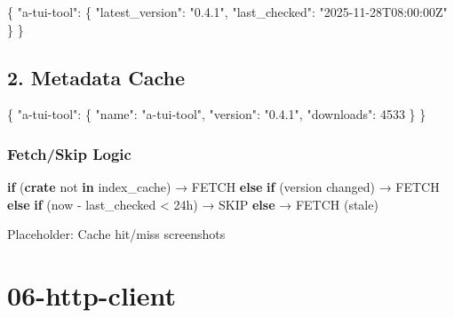 \documentclass[
  letterpaper,
  DIV=11,
  numbers=noendperiod]{scrreprt}
\newenvironment{Shaded}{\begin{snugshade}}{\end{snugshade}}
\newcommand{\ControlFlowTok}[1]{\textcolor[rgb]{0.00,0.23,0.31}{\textbf{#1}}}
\newcommand{\DataTypeTok}[1]{\textcolor[rgb]{0.68,0.00,0.00}{#1}}
\newcommand{\DecValTok}[1]{\textcolor[rgb]{0.68,0.00,0.00}{#1}}
\newcommand{\FunctionTok}[1]{\textcolor[rgb]{0.28,0.35,0.67}{#1}}
\newcommand{\KeywordTok}[1]{\textcolor[rgb]{0.00,0.23,0.31}{\textbf{#1}}}
\newcommand{\NormalTok}[1]{\textcolor[rgb]{0.00,0.23,0.31}{#1}}
\newcommand{\OperatorTok}[1]{\textcolor[rgb]{0.37,0.37,0.37}{#1}}
\newcommand{\StringTok}[1]{\textcolor[rgb]{0.13,0.47,0.30}{#1}}
\begin{document}
\begin{Shaded}
\begin{Highlighting}[]
\FunctionTok{\{}
  \DataTypeTok{"a{-}tui{-}tool"}\FunctionTok{:} \FunctionTok{\{}
    \DataTypeTok{"latest\_version"}\FunctionTok{:} \StringTok{"0.4.1"}\FunctionTok{,}
    \DataTypeTok{"last\_checked"}\FunctionTok{:} \StringTok{"2025{-}11{-}28T08:00:00Z"}
  \FunctionTok{\}}
\FunctionTok{\}}
\end{Highlighting}
\end{Shaded}

\section{2. Metadata Cache}\label{metadata-cache}

\begin{Shaded}
\begin{Highlighting}[]
\FunctionTok{\{}
  \DataTypeTok{"a{-}tui{-}tool"}\FunctionTok{:} \FunctionTok{\{}
    \DataTypeTok{"name"}\FunctionTok{:} \StringTok{"a{-}tui{-}tool"}\FunctionTok{,}
    \DataTypeTok{"version"}\FunctionTok{:} \StringTok{"0.4.1"}\FunctionTok{,}
    \DataTypeTok{"downloads"}\FunctionTok{:} \DecValTok{4533}
  \FunctionTok{\}}
\FunctionTok{\}}
\end{Highlighting}
\end{Shaded}

\subsection{Fetch/Skip Logic}\label{fetchskip-logic}

\begin{Shaded}
\begin{Highlighting}[]
\ControlFlowTok{if}\NormalTok{ (}\KeywordTok{crate}\NormalTok{ not }\KeywordTok{in}\NormalTok{ index\_cache) → FETCH}
\ControlFlowTok{else} \ControlFlowTok{if}\NormalTok{ (version changed) → FETCH}
\ControlFlowTok{else} \ControlFlowTok{if}\NormalTok{ (now }\OperatorTok{{-}}\NormalTok{ last\_checked }\OperatorTok{\textless{}}\NormalTok{ 24h) → SKIP}
\ControlFlowTok{else}\NormalTok{ → FETCH (stale)}
\end{Highlighting}
\end{Shaded}

Placeholder: Cache hit/miss screenshots

\chapter{06-http-client}\label{http-client}
\end{document}
